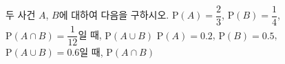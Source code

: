 두 사건 $A$, $B$에 대하여 다음을 구하시오.
 $\mathrm{P}(A)=\dfrac{2}{3}$, $\mathrm{P}(B)=\dfrac{1}{4}$, $\mathrm{P}(A\cap B)=\dfrac{1}{12}$일 때, $\mathrm{P}(A\cup B)$
 $\mathrm{P}(A)=0.2$, $\mathrm{P}(B)=0.5$, $\mathrm{P}(A\cup B)=0.6$일 때, $\mathrm{P}(A\cap B)$
